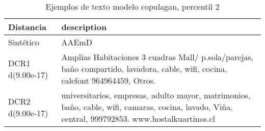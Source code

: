 \begin{table}[H]
\centering
\fontsize{10}{14}\selectfont
\caption{Ejemplos de texto modelo copulagan, percentil 2}
\label{table-example-economicos-b-1-copulagan-2p-text}
\begin{tabular}{|l|m{35em}|}
\hline
\rowcolor[gray]{0.8}
Distancia & description \\
\hline Sintético & AAEmD \\
\hline DCR1 d(9.00e-17) & Amplias Habitaciones 3 cuadras Mall/ p.sola/parejas, ba\~no compartido, lavadora, cable, wifi, cocina, calefont 964964459, Otros. \\
\hline DCR2 d(9.00e-17) & universitarios, empresas, adulto mayor, matrimonios, ba\~no, cable, wifi, camaras, cocina, lavado, Vi\~na, central, 999792853. www.hostalkuartinos.cl \\
\hline
\end{tabular}
\end{table}
